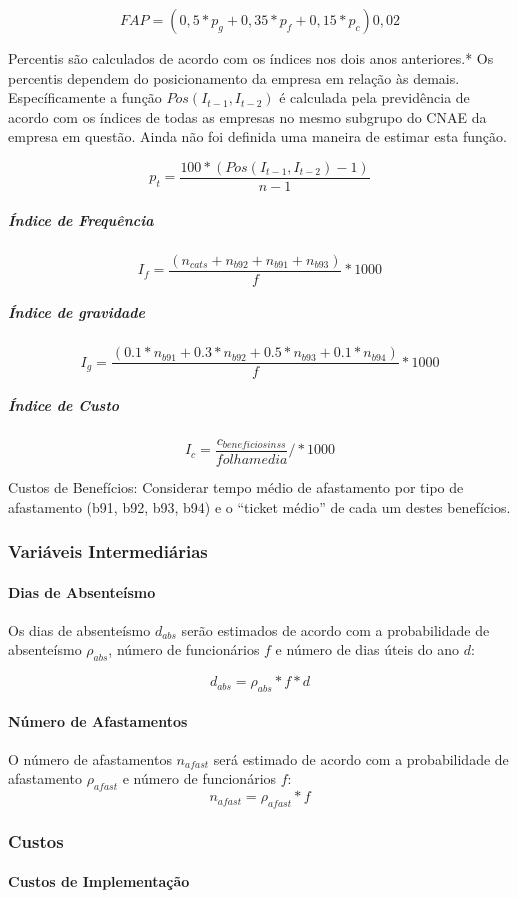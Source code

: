 \documentclass[]{article}
\let\oldparagraph\paragraph
\renewcommand{\paragraph}[1]{\oldparagraph{#1}\mbox{}}
\let\oldsubparagraph\subparagraph
\renewcommand{\subparagraph}[1]{\oldsubparagraph{#1}\mbox{}}
\begin{document}
\[FAP = (0,5*p_g + 0,35*p_{f}+0,15*p_c)0,02\]

Percentis são calculados de acordo com os índices nos dois anos
anteriores.* Os percentis dependem do posicionamento da empresa em
relação às demais. Específicamente a função \(Pos(I_{t-1},I_{t-2})\) é
calculada pela previdência de acordo com os índices de todas as empresas
no mesmo subgrupo do CNAE da empresa em questão. Ainda não foi definida
uma maneira de estimar esta função.

\[p_t = \frac{100*(Pos(I_{t-1},I_{t-2})-1)}{n-1}\]

\subparagraph{Índice de Frequência}\label{indice-de-frequencia}

\[I_f = \frac{(n_{cats}+n_{b92}+n_{b91}+n_{b93})}{f} * 1000\]

\subparagraph{Índice de gravidade}\label{indice-de-gravidade}

\[I_g = \frac{(0.1*n_{b91}+0.3*n_{b92}+0.5*n_{b93}+0.1*n_{b94})}{f}* 1000\]

\subparagraph{Índice de Custo}\label{indice-de-custo}

\[I_c = \frac{c_{beneficios inss}}{folha media}/ * 1000\]

Custos de Benefícios: Considerar tempo médio de afastamento por tipo de
afastamento (b91, b92, b93, b94) e o ``ticket médio'' de cada um destes
benefícios.

\subsubsection{Variáveis Intermediárias}\label{variaveis-intermediarias}

\paragraph{Dias de Absenteísmo}\label{dias-de-absenteismo}

Os dias de absenteísmo \(d_{abs}\) serão estimados de acordo com a
probabilidade de absenteísmo \(\rho_{abs}\), número de funcionários
\(f\) e número de dias úteis do ano \(d\):

\[d_{abs} = \rho_{abs} * f * d\]

\paragraph{Número de Afastamentos}\label{numero-de-afastamentos}

O número de afastamentos \(n_{afast}\) será estimado de acordo com a
probabilidade de afastamento \(\rho_{afast}\) e número de funcionários
\(f\): \[n_{afast} = \rho_{afast} * f \]

\subsubsection{Custos}\label{custos}

\paragraph{Custos de Implementação}\label{custos-de-implementacao}
\end{document}

